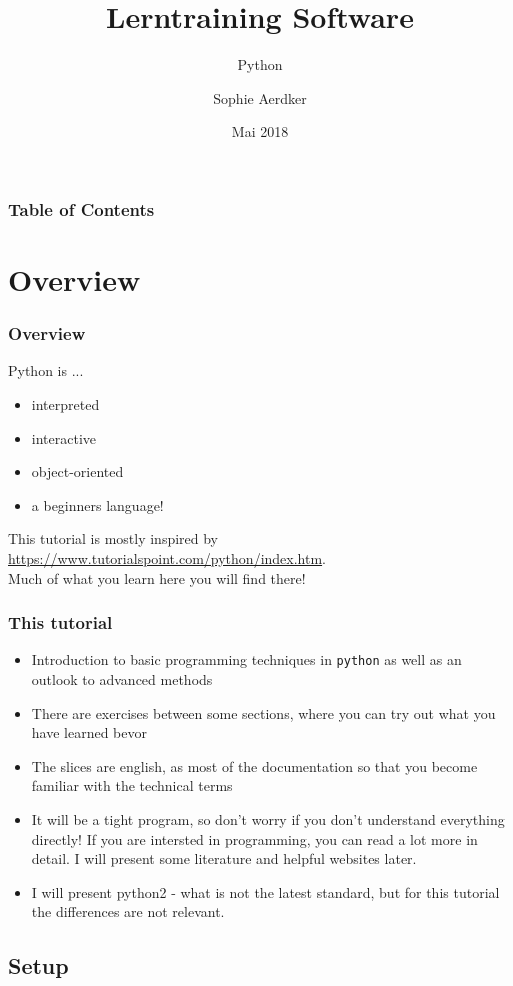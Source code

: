 \documentclass{beamer}
\title{Lerntraining Software}
\subtitle{Python}
\author{Sophie Aerdker}
\institute{Ruhr-Universit\"at Bochum}
\date{Mai 2018}
\begin{document}
 
\frame{\titlepage}
\begin{frame}
\frametitle{Table of Contents}
	\begin{multicols}{3}
 		 \tableofcontents
	\end{multicols}
\end{frame}

\section{Overview}

\begin{frame}
\frametitle{Overview}
	Python is ...\\
	\begin{itemize}
		\item interpreted
		\item interactive 
		\item object-oriented 
		\item a beginners language!
	\end{itemize}
	
	This tutorial is mostly inspired by \url{https://www.tutorialspoint.com/python/index.htm}. \\ Much of what you learn here you will find there!
\end{frame}

\begin{frame}
\frametitle{This tutorial}
	\begin{itemize}
		\item Introduction to basic programming techniques in \texttt{python} as well as an outlook to advanced methods
		\item There are exercises between some sections, where you can try out what you have learned bevor
		\item The slices are english, as most of the documentation so that you become familiar with the technical terms
		\item It will be a tight program, so don't worry if you don't understand everything directly! If you are intersted in programming, you can read a lot more in detail. I will present some literature and helpful websites later. 
		\item I will present python2 - what is not the latest standard, but for this tutorial the differences are not relevant.
	\end{itemize}
\end{frame}



\subsection{Setup}
\end{document}

